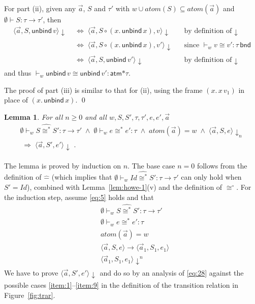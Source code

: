 \documentclass{LMCS}
\theoremstyle{plain}
\newtheorem{lemma}[thm]{Lemma}
\theoremstyle{definition}
\newcommand{\ATM}{\kw{atm}}
\newcommand{\atoms}{\mathit{atom}}
\newcommand{\bimp}{\Leftrightarrow}
\newcommand{\BINDTY}{\kw{bnd}}
\newcommand{\comp}{\circ}
\newcommand{\config}[3]{\langle#1, #2, #3\rangle}
\renewcommand{\conj}{\wedge}
\newcommand{\CR}[1]{\mathrel{\widehat{#1}}}
\newcommand{\ent}{\vdash}
\newcommand{\enty}{\vdash}
\newcommand{\es}{\mathit{Id}}
\renewcommand{\exp}[1][e]{#1}
\newcommand{\FUNTY}{\mathbin{\rightarrow}}
\newcommand{\imp}{\Rightarrow}
\newcommand{\kw}[1]{\mathsf{#1}}
\newcommand{\ofty}{:}
\newcommand{\opeq}{\cong}
\newcommand{\opeqo}{\cong^{\circ}}
\newcommand{\PRODTY}{\mathbin{\kw{*}}}
\newcommand{\s}[1][a]{\vec{#1}}
\newcommand{\stk}[1][S]{#1}
\newcommand{\terminates}[1][]{{\downarrow_{#1}}}
\newcommand{\trans}{\longrightarrow}
\newcommand{\ty}{\tau}
\newcommand{\UNBIND}{\kw{unbind}}
\newcommand{\val}[1][v]{#1}
\newcommand{\vid}[1][x]{#1}
\newcommand{\w}[1][w]{#1}
\begin{document}
  For part (ii), given any $\s$, $\stk$ and $\ty'$ with
  $\w\cup\atoms(\stk)\subseteq\atoms(\s)$ and
  $\emptyset\enty\stk\ofty\ty\FUNTY\ty'$, then
   \begin{align*}
     \config{\s}{\stk}{\UNBIND\,\val}\terminates
     &\;\bimp\; \config{\s}{\stk\comp(\vid.\,\UNBIND\,\vid)}{\val}\terminates
     &&\text{by definition of $\terminates$}\\
     &\;\bimp\; \config{\s}{\stk\comp(\vid.\,\UNBIND\,\vid)}{\val'}\terminates
     &&\text{since ${}\ent_{\w} \val\opeq\val'\ofty\ty\,\BINDTY$}\\
     &\;\bimp\; \config{\s}{\stk}{\UNBIND\,\val'}\terminates
     &&\text{by definition of $\terminates$}
   \end{align*}
   and thus ${}\ent_{\w} \UNBIND\,\val \opeq \UNBIND\,\val'\ofty
   \ATM\PRODTY\ty$.
   
   The proof of part (iii) is similar to that for (ii), using the
   frame $(\vid.\,\vid\,\val_1)$ in place of $(\vid.\,\UNBIND\,\vid)$.
\qed

\begin{lemma}
  \label{lem:howe-key}
  For all $n\geq 0$ and all $\w,\stk,\stk',\ty,\ty',\exp,\exp',\s$
  \begin{multline}
    \label{eq:5}
    \emptyset\ent_{\w} \stk \CR{\opeq^*} \stk' \ofty \ty\FUNTY\ty'
    \;\conj\; \emptyset\ent_{\w}\exp\opeq^*\exp'\ofty\ty \;\conj\;
    \atoms(\s)=\w \;\conj\;
    \config{\s}{\stk}{\exp}\terminates[n]\\
    \;\imp\; \config{\s}{\stk'}{\exp'}\terminates\;.
  \end{multline}
\end{lemma}
\proof
  The lemma is proved by induction on $n$. The base case $n=0$ follows
  from the definition of $\CR{-}$ (which implies that
  $\emptyset\ent_{\w}\es\CR{\opeq^*}\stk'\ofty\ty\FUNTY\ty'$ can only
  hold when $\stk'=\es$), combined with Lemma~\ref{lem:howe-1}(v) and
  the definition of $\opeqo$. For the induction step, assume
  \eqref{eq:5} holds and that
  \begin{align}
    &\emptyset\ent_{\w} \stk\CR{\opeq^*}\stk'\ofty\ty\FUNTY\ty'\label{eq:26}\\
    &\emptyset\ent_{\w} \exp \opeq^* \exp'\ofty\ty\label{eq:27}\\
    &\atoms(\s) = \w\label{eq:25}\\
    &\config{\s}{\stk}{\exp}\trans\config{\s_1}{\stk_1}{\exp_1}\label{eq:28}\\
    &\config{\s_1}{\stk_1}{\exp_1}\terminates^n\label{eq:29} 
  \end{align}
  We have to prove $\config{\s}{\stk'}{\exp'}\terminates$ and do so by
  an analysis of \eqref{eq:28} against the possible cases
  \ref{item:1}--\ref{item:9} in the definition
  of the transition relation in Figure~\ref{fig:trar}.
\end{document}
